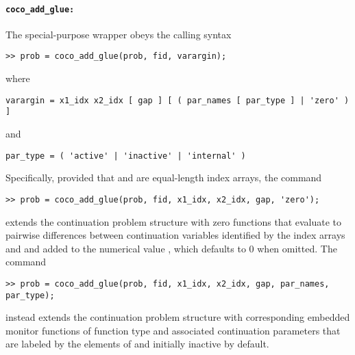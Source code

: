 \paragraph{\texttt{coco\_add\_glue:}}
The  special-purpose wrapper obeys the calling syntax
\begin{lstlisting}[language=coco-highlight]
>> prob = coco_add_glue(prob, fid, varargin);
\end{lstlisting}
where
\begin{lstlisting}[language=coco-highlight]
varargin = x1_idx x2_idx [ gap ] [ ( par_names [ par_type ] | 'zero' ) ]
\end{lstlisting}
and
\begin{lstlisting}[language=coco-highlight]
par_type = ( 'active' | 'inactive' | 'internal' )
\end{lstlisting}
Specifically, provided that  and  are equal-length index arrays, the command
\begin{lstlisting}[language=coco-highlight]
>> prob = coco_add_glue(prob, fid, x1_idx, x2_idx, gap, 'zero');
\end{lstlisting}
extends the continuation problem structure with zero functions that evaluate to pairwise differences between continuation variables identified by the index arrays  and  and added to the numerical value , which defaults to $0$ when omitted. The command
\begin{lstlisting}[language=coco-highlight]
>> prob = coco_add_glue(prob, fid, x1_idx, x2_idx, gap, par_names, par_type);
\end{lstlisting}
instead extends the continuation problem structure with corresponding embedded monitor functions of function type  and associated continuation parameters that are labeled by the elements of  and initially inactive by default.


